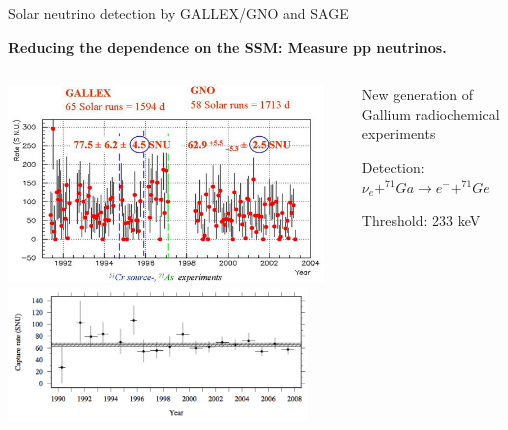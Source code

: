 \begin{frame}[t]{Solar neutrino detection by GALLEX/GNO and SAGE}

\begin{center}
{\bf Reducing the dependence on the SSM: Measure pp neutrinos.}\\
\end{center}
\begin{columns}
  \begin{column}{0.55\textwidth}
    \centering
     \includegraphics[width=0.95\textwidth]{./images/3nu/solar/gallex_gno_results.jpg}\\
     \includegraphics[width=0.90\textwidth]{./images/3nu/solar/sage_results.png}\\
  \end{column}
  \begin{column}{0.45\textwidth}
    \begin{itemize}
    {\small
      \item New generation of Gallium radiochemical experiments
      \item Detection: {\color{red}$\nu_{e} + ^{71}Ga \rightarrow e^{-} + ^{71}Ge$}
      \item Threshold: 233 keV
        \begin{itemize}

\end{itemize}}
\end{itemize}
\end{column}
\end{columns}
\end{frame}
